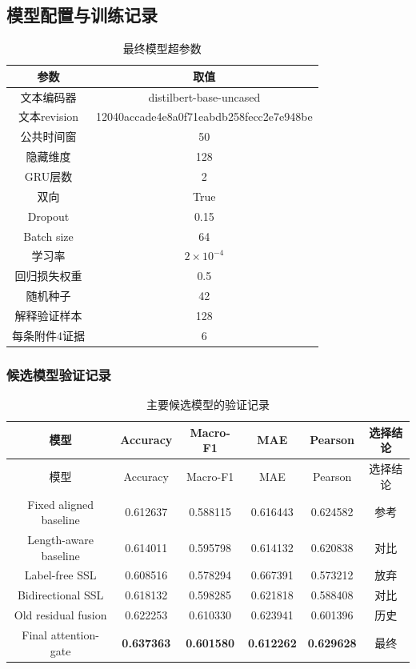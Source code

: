 \documentclass{gmcmthesis}
\newcommand{\keymetric}[1]{\textbf{#1}}
\begin{document}
\begin{appendices}
\subsection{模型配置与训练记录}

\begin{table}[H]
\centering
\small
\caption{最终模型超参数}
\label{tab:final_hyperparams}
\begin{tabular}{cc}
\toprule 参数 & 取值 \\
\midrule
文本编码器 & distilbert-base-uncased \\
文本revision & 12040accade4e8a0f71eabdb258fecc2e7e948be \\
公共时间窗 & 50 \\
隐藏维度 & 128 \\
GRU层数 & 2 \\
双向 & True \\
Dropout & 0.15 \\
Batch size & 64 \\
学习率 & $2\times10^{-4}$ \\
回归损失权重 & 0.5 \\
随机种子 & 42 \\
解释验证样本 & 128 \\
每条附件4证据 & 6 \\
\bottomrule
\end{tabular}
\end{table}

\subsubsection{候选模型验证记录}
\begingroup
\small
\begin{longtable}{cccccc}
\caption{主要候选模型的验证记录}\label{tab:train_records}\\
\toprule 模型 & Accuracy & Macro-F1 & MAE & Pearson & 选择结论 \\
\midrule
\endfirsthead
\toprule 模型 & Accuracy & Macro-F1 & MAE & Pearson & 选择结论 \\
\midrule
\endhead
Fixed aligned baseline & 0.612637 & 0.588115 & 0.616443 & 0.624582 & 参考 \\
Length-aware baseline & 0.614011 & 0.595798 & 0.614132 & 0.620838 & 对比 \\
Label-free SSL & 0.608516 & 0.578294 & 0.667391 & 0.573212 & 放弃 \\
Bidirectional SSL & 0.618132 & 0.598285 & 0.621818 & 0.588408 & 对比 \\
Old residual fusion & 0.622253 & 0.610330 & 0.623941 & 0.601396 & 历史 \\
Final attention-gate & \keymetric{0.637363} & \keymetric{0.601580} & \keymetric{0.612262} & \keymetric{0.629628} & 最终 \\
\bottomrule
\end{longtable}
\endgroup

\end{appendices}
\end{document}
